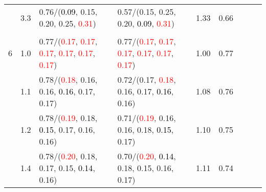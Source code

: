 \documentclass[10pt,a4paper]{report}
\begin{document}
\begin{table}[!htbp]
\begin{center}
{\begin{tabular}{ccllccccc}
				  & 3.3                               & 0.76/(\textcolor{black}{0.09}, 0.15, 0.20, 0.25, \textcolor{red}{0.31})                                                                                                                       & 0.57/(0.15, 0.25, 0.20, \textcolor{black}{0.09}, \textcolor{red}{0.31})                                                                                                                       & 1.33             & 0.66                     \\
				  &                                   &                                                                                                                                                                                               &                                                                                                                                                                                               &                                             \\
				6 & 1.0                               & 0.77/(\textcolor{red}{0.17}, \textcolor{red}{0.17}, \textcolor{red}{0.17}, \textcolor{red}{0.17}, \textcolor{red}{0.17}, \textcolor{red}{0.17})                                               & 0.77/(\textcolor{red}{0.17}, \textcolor{red}{0.17}, \textcolor{red}{0.17}, \textcolor{red}{0.17}, \textcolor{red}{0.17}, \textcolor{red}{0.17})                                               & 1.00             & 0.77                     \\
				  & 1.1                               & 0.78/(\textcolor{red}{0.18}, 0.16, 0.16, \textcolor{black}{0.16}, 0.17, 0.17)                                                                                                                 & 0.72/(0.17, \textcolor{red}{0.18}, 0.16, 0.17, \textcolor{black}{0.16}, 0.16)                                                                                                                 & 1.08             & 0.76                     \\
				  & 1.2                               & 0.78/(\textcolor{red}{0.19}, 0.18, \textcolor{black}{0.15}, 0.17, 0.16, 0.16)                                                                                                                 & 0.71/(\textcolor{red}{0.19}, 0.16, 0.16, 0.18, \textcolor{black}{0.15}, 0.17)                                                                                                                 & 1.10             & 0.75                     \\
				  & 1.4                               & 0.78/(\textcolor{red}{0.20}, 0.18, 0.17, 0.15, \textcolor{black}{0.14}, 0.16)                                                                                                                 & 0.70/(\textcolor{red}{0.20}, \textcolor{black}{0.14}, 0.18, 0.15, 0.16, 0.17)                                                                                                                 & 1.11             & 0.74                     \\

\end{tabular}}
\end{center}
\end{table}
\end{document}
